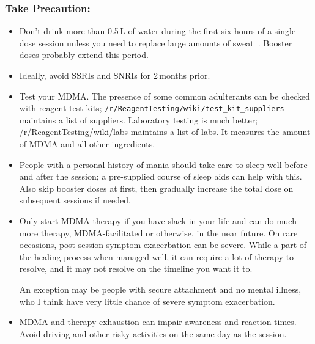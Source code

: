 \documentclass[11pt,oneside]{book}
\newcommand{\mdcite}[1]{}
\newcommand{\mdonly}[1]{}
\begin{document}
\subsubsection*{Take Precaution:}
\begin{itemize}
    \item Don't drink more than 0.5\,L of water during the first six hours of a single-dose session unless you need to replace large amounts of sweat~\mdcite{myBook}. Booster doses probably extend this period.
    \item Ideally, avoid SSRIs and SNRIs for 2\,months prior.
    \item Test your MDMA. The presence of some common adulterants can be checked with reagent test kits; \href{https://www.reddit.com/r/ReagentTesting/wiki/test\_kit\_suppliers}{\nolinkurl{/r/ReagentTesting/wiki/test\_kit\_suppliers}} maintains a list of suppliers. Laboratory testing is much better; \href{https://www.reddit.com/r/ReagentTesting/wiki/labs}{/r/ReagentTesting/wiki/labs} maintains a list of labs. It measures the amount of MDMA and all other ingredients.
    \item People with a personal history of mania should take care to sleep well before and after the session; a pre-supplied course of sleep aids can help with this. Also skip booster doses at first, then gradually increase the total dose on subsequent sessions if needed.
    \item Only start MDMA therapy if you have slack in your life and can do much more therapy, MDMA-facilitated or otherwise, in the near future. On rare occasions, post-session symptom exacerbation can be severe. While a part of the healing process when managed well, it can require a lot of therapy to resolve, and it may not resolve on the timeline you want it to.
    
    An exception may be people with secure attachment and no mental illness, who I think have very little chance of severe symptom exacerbation.
    \item MDMA and therapy exhaustion can impair awareness and reaction times. Avoid driving and other risky activities on the same day as the session.
\end{itemize}

\mdonly{Written by Mark Groeneveld (u/night81) based on a draft of their book \textit{Open MDMA: An Evidence-Based Synthesis, Theory, and Manual for MDMA Therapy Based on Memory Reconsolidation, Complex Systems, and the Defense Cascade} (\href{https://www.doi.org/10.31234/osf.io/aps5g}{doi.org/10.31234/osf.io/aps5g}) and feedback from /r/mdmatherapy.

Please comment or DM if you spot any errors or have any suggestions!

This work is licensed under \href{https://creativecommons.org/licenses/by/4.0/}{CC BY 4.0}.}
\end{document}
